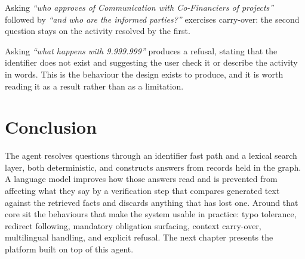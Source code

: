 Asking \textit{``who approves of Communication with Co-Financiers of projects''} followed by \textit{``and who are the informed parties?''} exercises carry-over: the second question stays on the activity resolved by the first.

Asking \textit{``what happens with 9.999.999''} produces a refusal, stating that the identifier does not exist and suggesting the user check it or describe the activity in words. This is the behaviour the design exists to produce, and it is worth reading it as a result rather than as a limitation.

\section*{Conclusion}

The agent resolves questions through an identifier fast path and a lexical search layer, both deterministic, and constructs answers from records held in the graph. A language model improves how those answers read and is prevented from affecting what they say by a verification step that compares generated text against the retrieved facts and discards anything that has lost one. Around that core sit the behaviours that make the system usable in practice: typo tolerance, redirect following, mandatory obligation surfacing, context carry-over, multilingual handling, and explicit refusal. The next chapter presents the platform built on top of this agent.
